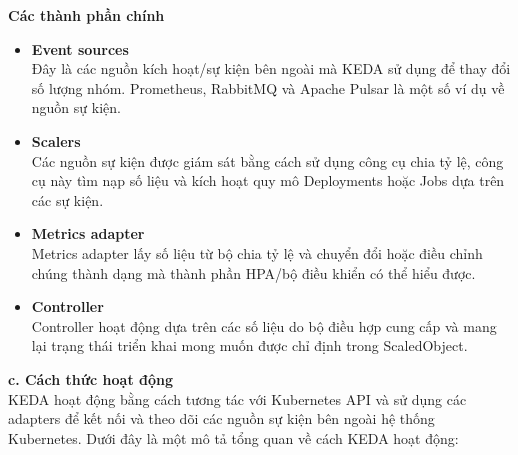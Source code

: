 \textbf{Các thành phần chính}
\begin{itemize}
    \item \textbf{Event sources}\\
    Đây là các nguồn kích hoạt/sự kiện bên ngoài mà KEDA sử dụng để thay đổi số lượng nhóm. Prometheus, RabbitMQ và Apache Pulsar là một số ví dụ về nguồn sự kiện.
    \item \textbf{Scalers}\\
    Các nguồn sự kiện được giám sát bằng cách sử dụng công cụ chia tỷ lệ, công cụ này tìm nạp số liệu và kích hoạt quy mô Deployments hoặc Jobs dựa trên các sự kiện.
    \item \textbf{Metrics adapter}\\
    Metrics adapter lấy số liệu từ bộ chia tỷ lệ và chuyển đổi hoặc điều chỉnh chúng thành dạng mà thành phần HPA/bộ điều khiển có thể hiểu được.
    \item \textbf{Controller}\\
    Controller hoạt động dựa trên các số liệu do bộ điều hợp cung cấp và mang lại trạng thái triển khai mong muốn được chỉ định trong ScaledObject.
\end{itemize}
\textbf{c. Cách thức hoạt động}\\[0.5cm]
KEDA hoạt động bằng cách tương tác với Kubernetes API và sử dụng các adapters để kết nối và theo dõi các nguồn sự kiện bên ngoài hệ thống Kubernetes. Dưới đây là một mô tả tổng quan về cách KEDA hoạt động:
